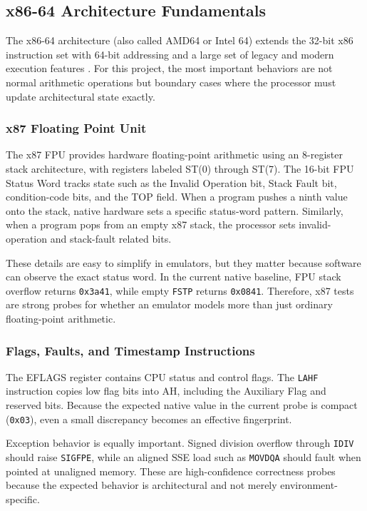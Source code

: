 
\subsection{x86-64 Architecture Fundamentals}

The x86-64 architecture (also called AMD64 or Intel 64) extends the 32-bit x86 instruction set with 64-bit addressing and a large set of legacy and modern execution features \cite{intel2023manual}. For this project, the most important behaviors are not normal arithmetic operations but boundary cases where the processor must update architectural state exactly.

\subsubsection{x87 Floating Point Unit}

The x87 FPU provides hardware floating-point arithmetic using an 8-register stack architecture, with registers labeled ST(0) through ST(7). The 16-bit FPU Status Word tracks state such as the Invalid Operation bit, Stack Fault bit, condition-code bits, and the TOP field. When a program pushes a ninth value onto the stack, native hardware sets a specific status-word pattern. Similarly, when a program pops from an empty x87 stack, the processor sets invalid-operation and stack-fault related bits.

These details are easy to simplify in emulators, but they matter because software can observe the exact status word. In the current native baseline, FPU stack overflow returns \texttt{0x3a41}, while empty \texttt{FSTP} returns \texttt{0x0841}. Therefore, x87 tests are strong probes for whether an emulator models more than just ordinary floating-point arithmetic.

\subsubsection{Flags, Faults, and Timestamp Instructions}

The EFLAGS register contains CPU status and control flags. The \texttt{LAHF} instruction copies low flag bits into AH, including the Auxiliary Flag and reserved bits. Because the expected native value in the current probe is compact (\texttt{0x03}), even a small discrepancy becomes an effective fingerprint.

Exception behavior is equally important. Signed division overflow through \texttt{IDIV} should raise \texttt{SIGFPE}, while an aligned SSE load such as \texttt{MOVDQA} should fault when pointed at unaligned memory. These are high-confidence correctness probes because the expected behavior is architectural and not merely environment-specific.

